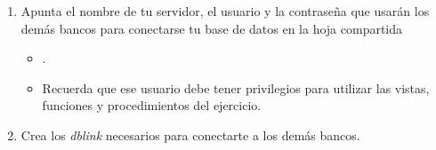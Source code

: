 \begin{homeworkProblem}
  
  \begin{enumerate}
  \item Apunta el nombre de tu servidor, el usuario y la contraseña que usarán los demás bancos para conectarse tu base de datos en la hoja compartida 
    \begin{itemize}
    \item {}.
    \item Recuerda que ese usuario debe tener privilegios para utilizar las vistas, funciones y procedimientos del ejercicio.
    \end{itemize}
  
  \item Crea los \textit{dblink} necesarios para conectarte a los demás bancos.

    
\end{enumerate}
\end{homeworkProblem}

